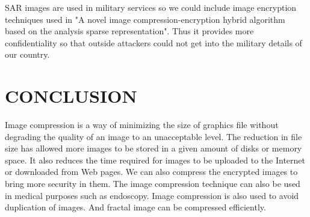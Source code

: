 \documentclass[10pt,a4paper,journal]{IEEEtran}
\begin{document}
\hspace*{2em} SAR images are used in military services so we could include image encryption techniques used in "A novel image compression-encryption hybrid algorithm based on the analysis sparse representation". Thus it provides more confidentiality so that outside attackers could not get into the military details of our country.

\section{CONCLUSION}
\hspace{2em} Image compression is a way of  minimizing the size  of  graphics file without degrading the quality of an image to an unacceptable level. The reduction in file size has allowed more images to be stored in a given amount of disks or memory space. It also reduces the time required for images to be uploaded to the Internet or downloaded from Web pages. We can also
compress the encrypted images to bring more security in them. The image compression technique can
also be used in medical purposes such as endoscopy. Image compression is also used to avoid
duplication of images. And fractal image can be compressed efficiently.
\end{document}
